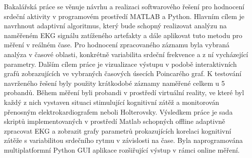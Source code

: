 Bakalářská práce se věnuje návrhu a realizaci softwarového řešení pro hodnocení
srdeční aktivity v programovém prostředí MATLAB a Python. Hlavním cílem je
navrhnout adaptivní algoritmus, který bude schopný realizovat analýzu na
naměřeném EKG signálu zatíženého artefakty a dále aplikovat tuto metodu pro
měření v reálném čase. Pro hodnocení zpracovaného záznamu byla vybraná analýza v
časové oblasti, konkrétně variabilita srdeční frekvence a z ní vycházející
parametry. Dalším cílem práce je vizualizace výstupu v podobě interaktivních
grafů zobrazujících ve vybraných časových úsecích Poincarého graf. K testování
navrženého řešení byly použity krátkodobé záznamy naměřené celkem u 5 probandů.
Během měření byli probandi v prostředí virtuální reality, ve které byl každý z
nich vystaven situaci stimulující kognitivní zátěž a monitorován přenosným
elektrokardiografem neboli Holterovsky. Výsledkem práce je sada skriptů
implementovaných v prostředí Matlab schopných offline adaptivně zpracovat EKG a
zobrazit grafy parametrů prokazujících korelaci kognitivní zátěže s variabilitou
srdečního rytmu v závislosti na čase. Byla naprogramována multiplatformní Python
GUI aplikace rozšiřující výstup v rámci online měření.